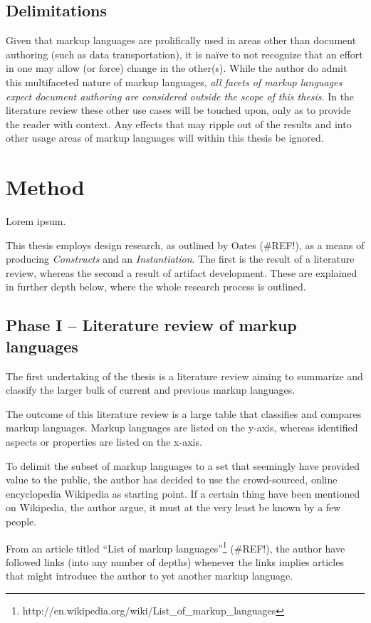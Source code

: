 \documentclass{scrreprt}
\begin{document}
\section{Delimitations}
Given that markup languages are prolifically used in areas other than document authoring (such as data transportation), it is naïve to not recognize that an effort in one may allow (or force) change in the other(s). While the author do admit this multifaceted nature of markup languages, \emph{all facets of markup languages expect document authoring are considered outside the scope of this thesis}. In the literature review these other use cases will be touched upon, only as to provide the reader with context. Any effects that may ripple out of the results and into other usage areas of markup languages will within this thesis be ignored. 




\chapter{Method}
Lorem ipsum.

This thesis employs design research, as outlined by Oates (\#REF!), as a means of producing \emph{Constructs} and an \emph{Instantiation}. The first is the result of a literature review, whereas the second a result of artifact development. These are explained in further depth below, where the whole research process is outlined.


\section{Phase I -- Literature review of markup languages}
The first undertaking of the thesis is a literature review aiming to summarize and classify the larger bulk of current and previous markup languages.

The outcome of this literature review is a large table that classifies and compares markup languages. Markup languages are listed on the y-axis, whereas identified aspects or properties are listed on the x-axis.

To delimit the subset of markup languages to a set that seemingly have provided value to the public, the author has decided to use the crowd-sourced, online encyclopedia Wikipedia as starting point. If a certain thing have been mentioned on Wikipedia, the author argue, it must at the very least be known by a few people.

From an article titled ``List of markup languages''\footnote{http://en.wikipedia.org/wiki/List\_of\_markup\_languages} (\#REF!), the author have followed links (into any number of depths) whenever the links implies articles that might introduce the author to yet another markup language.
\end{document}
